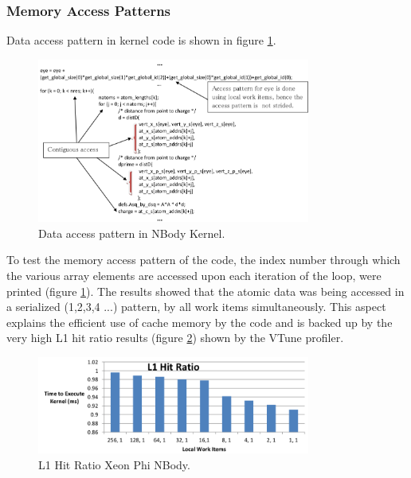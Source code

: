 \subsubsection{Memory Access Patterns}
\par{Data access pattern in kernel code is shown in figure \ref{nbodyMAP}.}

\begin{figure}[!h]
    \centering
    \includegraphics[width=0.8\textwidth]{figures/nbodyMAP.png}
    \caption{Data access pattern in NBody Kernel.}
    \label{nbodyMAP}
\end{figure}

\par{To test the memory access pattern of the code, the index 
    number through which the various array elements are accessed
    upon each iteration of the loop, were printed (figure \ref{nbodyMAP}). 
    The results showed that the atomic data was being accessed in a 
    serialized (1,2,3,4 ...) pattern, by all work items simultaneously. 
    This aspect explains the efficient use of cache memory by the code and 
    is backed up by the very high L1 hit ratio results (figure \ref{nbodyL1}) 
    shown by the VTune profiler.}

\begin{figure}[!h]
    \centering
    \includegraphics[width=0.8\textwidth]{figures/nbodyL1.png}
    \caption{L1 Hit Ratio Xeon Phi NBody.}
    \label{nbodyL1}
\end{figure}

